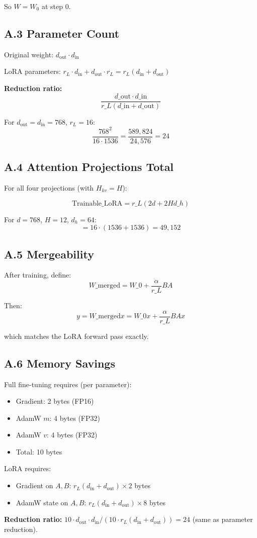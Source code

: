 So $W = W_0$ at step 0.

\subsection{A.3 Parameter Count}

Original weight: $d_\text{out} \cdot d_\text{in}$

LoRA parameters: $r_L \cdot d_\text{in} + d_\text{out} \cdot r_L = r_L (d_\text{in} + d_\text{out})$

\textbf{Reduction ratio:}
\[
\frac{d\_\text{out} \cdot d\_\text{in}}{r\_L (d\_\text{in} + d\_\text{out})}
\tag{A.3}
\]

For $d_\text{out} = d_\text{in} = 768$, $r_L = 16$:
\[
\frac{768^2}{16 \cdot 1536} = \frac{589,824}{24,576} = 24
\tag{A.4}
\]

\subsection{A.4 Attention Projections Total}

For all four projections (with $H_{kv} = H$):

\[
\text{Trainable}\_\text{LoRA} = r\_L (2d + 2 H d\_h)
\tag{A.5}
\]

For $d = 768$, $H = 12$, $d_h = 64$:
\[
= 16 \cdot (1536 + 1536) = 49,152
\tag{A.6}
\]

\subsection{A.5 Mergeability}

After training, define:
\[
W\_\text{merged} = W\_0 + \frac{\alpha}{r\_L} B A
\tag{A.7}
\]

Then:
\[
y = W\_\text{merged} x = W\_0 x + \frac{\alpha}{r\_L} B A x
\tag{A.8}
\]

which matches the LoRA forward pass exactly.

\subsection{A.6 Memory Savings}

Full fine-tuning requires (per parameter):
\begin{itemize}
\item Gradient: 2 bytes (FP16)
\item AdamW $m$: 4 bytes (FP32)
\item AdamW $v$: 4 bytes (FP32)
\item Total: 10 bytes

\end{itemize}
LoRA requires:
\begin{itemize}
\item Gradient on $A, B$: $r_L(d_\text{in} + d_\text{out}) \times 2$ bytes
\item AdamW state on $A, B$: $r_L(d_\text{in} + d_\text{out}) \times 8$ bytes

\end{itemize}
\textbf{Reduction ratio:} $10 \cdot d_\text{out} \cdot d_\text{in} / (10 \cdot r_L (d_\text{in} + d_\text{out})) = 24$ (same as parameter reduction).

